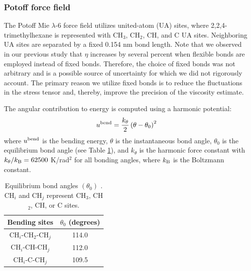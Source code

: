 \documentclass[preprint,review,12pt]{elsarticle}
\begin{document}
    \subsubsection{Potoff force field}
	
	The Potoff Mie $\lambda$-6 force field utilizes united-atom (UA) sites, where 2,2,4-trimethylhexane is represented with CH$_3$, CH$_2$, CH, and C UA sites. Neighboring UA sites are separated by a fixed 0.154 nm bond length. Note that we observed in our previous study that $\eta$ increases by several percent when flexible bonds are employed instead of fixed bonds. Therefore, the choice of fixed bonds was not arbitrary and is a possible source of uncertainty for which we did not rigorously account. The primary reason we utilize fixed bonds is to reduce the fluctuations in the stress tensor and, thereby, improve the precision of the viscosity estimate.
	
	The angular contribution to energy is computed using a harmonic potential:
	\begin{equation}
	u^{\rm bend} = \frac{k_\theta}{2} \left(\theta-\theta_0\right)^2
	\end{equation}
	where $u^{\rm bend}$ is the bending energy, $\theta$ is the instantaneous bond angle, $\theta_0$ is the equilibrium bond angle (see Table \ref{tab:angles}), and $k_\theta$ is the harmonic force constant with $k_\theta/k_{\rm B} = 62500$ K/rad$^2$ for all bonding angles, where $k_{\rm B}$ is the Boltzmann constant. 
	
	\begin{table}[h!]
		\caption{Equilibrium bond angles $(\theta_0)$ \cite{Martin1999,Potoff_branched}. CH$_i$ and CH$_j$ represent CH$_3$, CH$_2$, CH, or C sites.} \label{tab:angles}
		\begin{center}
			\begin{tabular}{|c|c|}
				\hline
				Bending sites & $\theta_0$ (degrees) \\ \hline
				CH$_i$-CH$_2$-CH$_j$ & 114.0 \\ 
				CH$_i$-CH-CH$_j$ & 112.0 \\ 
				CH$_i$-C-CH$_j$ & 109.5 \\  
				\hline
			\end{tabular}
		\end{center} 
	\end{table}
	
	
\end{document}
